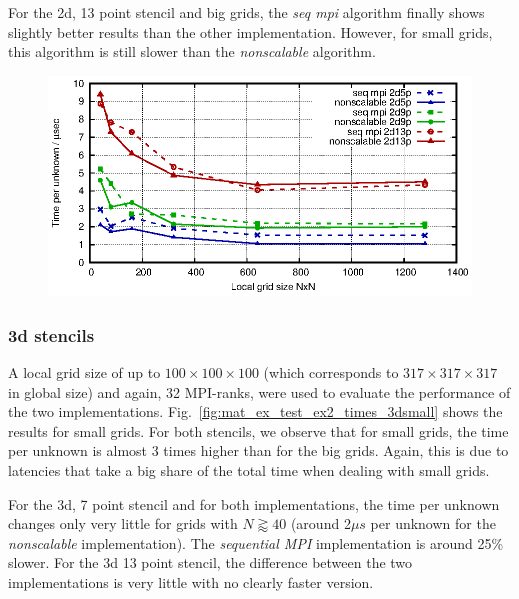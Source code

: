 For the 2d, 13 point stencil and big grids, the \textit{seq mpi} algorithm finally shows slightly better results than the other implementation. However, for small grids, this algorithm is still slower than the \textit{nonscalable} algorithm. 

\begin{figure}[tbp]
	\centering
	\includegraphics[width=1\textwidth]{times_2d}
	\caption{} 
	\label{fig:mat_ex_test_ex2_times_2d}
\end{figure}

\subsubsection*{3d stencils}
A local grid size of up to $100 \times 100 \times 100$ (which corresponds to $317 \times 317 \times 317$ in global size) and again, 32 MPI-ranks, were used to evaluate the performance of the two implementations.  Fig.~\ref{fig:mat_ex_test_ex2_times_3dsmall} shows the results for small grids. For both stencils, we observe that for small grids, the time per unknown is almost 3 times higher than for the big grids. Again, this is due to latencies that take a big share of the total time when dealing with small grids.

For the 3d, 7 point stencil and for both implementations, the time per unknown changes only very little for grids with $N \gtrapprox 40$ (around 2$\mu  s$ per unknown for the \textit{nonscalable} implementation). The \textit{sequential MPI} implementation is around 25\% slower. For the 3d 13 point stencil, the difference between the two implementations is very little with no clearly faster version. 


